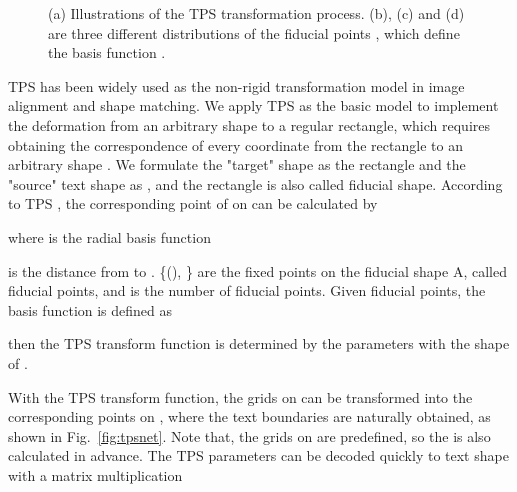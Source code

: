 \documentclass[sigconf]{acmart}
\begin{document}
	\begin{figure}
		\vspace{-0.2cm} 
		\centering
		\setlength{\abovecaptionskip}{5px}
		\subfigbottomskip=-3pt
		\subfigcapskip=-5pt
		\caption{(a) Illustrations of the TPS transformation process. (b), (c) and (d) are three different distributions of the fiducial points , which define the basis function .}
		\label{fig:fid}
		\vspace{-8px}
	\end{figure}
	
	TPS \cite{bookstein1989principal} has been widely used as the non-rigid transformation model in image alignment and shape matching. We apply TPS as the basic model to implement the deformation from an arbitrary shape  to a regular rectangle, which requires obtaining the correspondence of every coordinate from the rectangle to an arbitrary shape . We formulate the "target" shape as the rectangle  and the "source" text shape as , and the rectangle  is also called fiducial shape. According to TPS   \cite{bookstein1989principal}, the corresponding point of  on  can be calculated by
	
where  is the radial basis function
	
	 is the distance from  to . \{(), \} are the fixed points on the fiducial shape A, called fiducial points, and  is the number of fiducial points. Given fiducial points, the basis function is defined as 
	
	then the TPS transform function is determined by the parameters  with the shape of . 
	
	
	With the TPS transform function, 
	the grids  on  can be  transformed into the corresponding points on , where the text boundaries are naturally obtained, 
	as shown in Fig.~\ref{fig:tpsnet}. Note that, the grids on  are  predefined, so the  is also calculated in advance. The TPS parameters  can be decoded quickly to text shape with a matrix multiplication 
	
	
	
\end{document}
